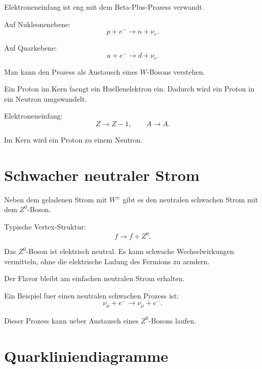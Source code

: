Elektroneneinfang ist eng mit dem Beta-Plus-Prozess verwandt.

\begin{formulabox}
Auf Nukleonenebene:
\[
    p + e^- \rightarrow n + \nu_e.
\]
\end{formulabox}

\begin{formulabox}
Auf Quarkebene:
\[
    u + e^- \rightarrow d + \nu_e.
\]
\end{formulabox}

\begin{conceptbox}
Man kann den Prozess als Austausch eines $W$-Bosons verstehen.

Ein Proton im Kern faengt ein Huellenelektron ein.
Dadurch wird ein Proton in ein Neutron umgewandelt.
\end{conceptbox}

\begin{examtipbox}
Elektroneneinfang:
\[
    Z \rightarrow Z-1,
    \qquad
    A \rightarrow A.
\]

Im Kern wird ein Proton zu einem Neutron.
\end{examtipbox}

\section{Schwacher neutraler Strom}

Neben dem geladenen Strom mit $W^\pm$ gibt es den neutralen schwachen Strom mit
dem $Z^0$-Boson.

\begin{formulabox}
Typische Vertex-Struktur:
\[
    f \rightarrow f + Z^0.
\]
\end{formulabox}

\begin{conceptbox}
Das $Z^0$-Boson ist elektrisch neutral.
Es kann schwache Wechselwirkungen vermitteln, ohne die elektrische Ladung des
Fermions zu aendern.

Der Flavor bleibt am einfachen neutralen Strom erhalten.
\end{conceptbox}

\begin{examplebox}
Ein Beispiel fuer einen neutralen schwachen Prozess ist:
\[
    \nu_\mu + e^- \rightarrow \nu_\mu + e^-.
\]

Dieser Prozess kann ueber Austausch eines $Z^0$-Bosons laufen.
\end{examplebox}

\section{Quarkliniendiagramme}

